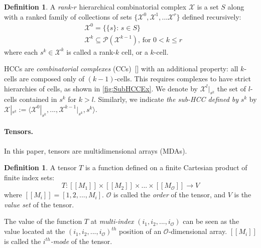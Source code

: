 \documentclass{article}
\theoremstyle{plain}
\theoremstyle{definition}
\newtheorem{definition}[theorem]{Definition}
\theoremstyle{remark}
\newcommand{\cX}{\mathcal{X}}
\newcommand{\cO}{\mathcal{O}}
\newcommand{\citenump}[1]{[\citenum{#1}]}
\let\oldparagraph\paragraph
\renewcommand{\paragraph}[1]{%
	\vspace{-0.5em}%
	\oldparagraph{#1}%
}
\begin{document}
\begin{definition}
	\label{def:HCCs}
	A \textit{rank-}$r$ hierarchical combinatorial complex $\cX$ is a set $S$ along with a ranked family of collections of sets $\{\mathcal{X}^0, \mathcal{X}^1, ... \mathcal{X}^r\}$ defined recursively:
	\begin{equation*}
		\begin{aligned}
			&\mathcal{X}^0 = \{\{s\} \text{: } s \in S\}\\
			&\mathcal{X}^k \subseteq \mathcal{P}(\mathcal{X}^{k-1}) \text{, for } 0 < k \leq r
		\end{aligned}
	\end{equation*}
	where each $s^k \in \mathcal{X}^k$ is called a rank-$k$ cell, or a $k$-cell.
\end{definition}

HCCs are \textit{combinatorial complexes} (CCs)~\citenump{TDLBook} with an additional property: all $k$-cells are composed only of $(k-1)$-cells. This requires complexes to have strict hierarchies of cells, as shown in \cref{fig:SubHCCEx}. We denote by $\mathcal{X}^l|_{s^k}$ the set of $l$-cells contained in $s^k$ for $k > l$. Similarly, we indicate \textit{the sub-HCC defined by} $s^k$ by $\mathcal{X}|_{s^k} := \langle \cX^0|_{s^k}, ..., \cX^{k-1}|_{s^k}, s^k \rangle$.
%
\paragraph{Tensors.}
In this paper, tensors are multidimensional arrays (MDAs).
\begin{definition}
	\label{def:Tensor}
	A tensor $T$ is a function defined on a finite Cartesian product of finite index sets:
	\begin{equation*}
		T: [[M_1]] \times [[M_2]] \times ... \times [[M_{\cO}]] \rightarrow V
	\end{equation*}
	where $[[M_i]] = [1, 2, ..., M_i]$. $\cO$ is called the \textit{order} of the tensor, and $V$ is the \textit{value set} of the tensor.
\end{definition}

The value of the function $T$ at \textit{multi-index} $(i_1, i_2, ..., i_{\cO})$ can be seen as the value located at the $(i_1, i_2, ..., i_{\cO})^{th}$ position of an $\cO$-dimensional array. $[[M_i]]$ is called the $i^{th}$\textit{-mode} of the tensor.
\end{document}
